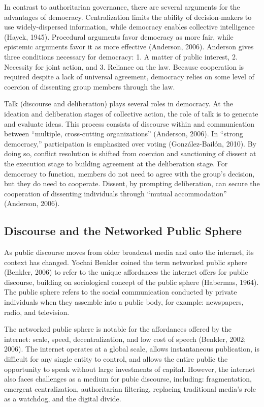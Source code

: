 In contrast to authoritarian governance, there are several arguments for the advantages of democracy. Centralization limits the ability of decision-makers to use widely-dispersed information, while democracy enables collective intelligence (Hayek, 1945). Procedural arguments favor democracy as more fair, while epistemic arguments favor it as more effective (Anderson, 2006). Anderson gives three conditions necessary for democracy: 1. A matter of public interest, 2. Necessity for joint action, and 3. Reliance on the law. Because cooperation is required despite a lack of universal agreement, democracy relies on some level of coercion of dissenting group members through the law.

Talk (discourse and deliberation) plays several roles in democracy. At the ideation and deliberation stages of collective action, the  role of talk is to generate and evaluate ideas. This process consists of discourse within and communication between ``multiple, cross-cutting organizations'' (Anderson, 2006). In ``strong democracy,'' participation is emphasized over voting (Gonz\'alez-Bail\'on, 2010). By doing so, conflict resolution is shifted from coercion and sanctioning of dissent at the execution stage to building agreement at the deliberation stage. For democracy to function, members do not need to agree with the group's decision, but they do need to cooperate. Dissent, by prompting deliberation, can secure the cooperation of dissenting individuals through ``mutual accommodation'' (Anderson, 2006).

\subsection{Discourse and the Networked Public Sphere}
As public discourse moves from older broadcast media and onto the internet, its context has changed. Yochai Benkler coined the term networked public sphere (Benkler, 2006) to refer to the unique affordances the internet offers for public discourse, building on sociological concept of the public sphere (Habermas, 1964). The public sphere refers to the social communication conducted by private individuals when they assemble into a public body, for example: newspapers, radio, and television.

The networked public sphere is notable for the affordances offered by the internet: scale, speed, decentralization, and low cost of speech (Benkler, 2002; 2006). The internet operates at a global scale, allows instantaneous publication, is difficult for any single entity to control, and allows the entire public the opportunity to speak without large investments of capital. However, the internet also faces challenges as a medium for pubic discourse, including: fragmentation, emergent centralization, authoritarian filtering, replacing traditional media's role as a watchdog, and the digital divide.

